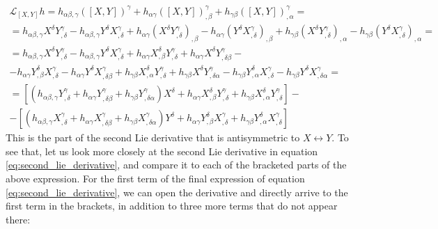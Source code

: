 \documentclass{article}
\begin{document}
\begin{equation}
\begin{gathered}
\label{eq:dev_lie_derivative_lie_brackets}
    \mathcal{L}_{[X,Y]} h = h_{\alpha\beta,\gamma}([X,Y])^\gamma + h_{\alpha\gamma} ([X,Y])^\gamma_{,\beta} + h_{\gamma\beta} ([X,Y])^\gamma_{,\alpha} = \\
    = h_{\alpha\beta,\gamma}X^\delta Y^\gamma_{,\delta} - h_{\alpha\beta,\gamma}Y^\delta X^\gamma_{,\delta} + 
    h_{\alpha\gamma}\left(X^\delta Y^\gamma_{,\delta}\right)_{,\beta} - h_{\alpha\gamma}\left(Y^\delta X^\gamma_{,\delta}\right)_{,\beta} + h_{\gamma\beta}\left(X^\delta Y^\gamma_{,\delta}\right)_{,\alpha} - h_{\gamma\beta}\left(Y^\delta X^\gamma_{,\delta}\right)_{,\alpha} = \\
    = h_{\alpha\beta, \gamma}X^\delta Y^\gamma_{,\delta} - h_{\alpha\beta,\gamma}Y^\delta X^\gamma_{,\delta} + 
    h_{\alpha\gamma} X^\delta_{,\beta} Y^\gamma_{,\delta} + 
    h_{\alpha\gamma} X^\delta Y^\gamma_{,\delta\beta} - \\ - h_{\alpha\gamma}Y^\delta_{,\beta} X^\gamma_{,\delta} - h_{\alpha\gamma}Y^\delta X^\gamma_{,\delta\beta} + h_{\gamma\beta} X^\delta_{,\alpha} Y^\gamma_{,\delta} + h_{\gamma\beta} X^\delta Y^\gamma_{,\delta\alpha} - h_{\gamma\beta} Y^\delta_{,\alpha} X^\gamma_{,\delta} - h_{\gamma\beta} Y^\delta X^\gamma_{,\delta\alpha} = \\ =
    \left[
        \left(
            h_{\alpha\beta, \gamma} Y^\gamma_{,\delta} +
            h_{\alpha\gamma} Y^\gamma_{,\delta\beta} +
            h_{\gamma\beta} Y^\gamma_{,\delta\alpha}
        \right)X^\delta +
        h_{\alpha\gamma} X^\delta_{,\beta} Y^\gamma_{,\delta} +
        h_{\gamma\beta} X^\delta_{,\alpha} Y^\gamma_{,\delta}
    \right] - \\
    - \left[
        \left(
            h_{\alpha\beta,\gamma} X^\gamma_{,\delta} +
        h_{\alpha\gamma} X^\gamma_{,\delta\beta} +
        h_{\gamma\beta} X^\gamma_{,\delta\alpha}
        \right) Y^\delta +
        h_{\alpha\gamma}Y^\delta_{,\beta}
        X^\gamma_{,\delta} +
        h_{\gamma\beta} Y^\delta_{,\alpha} X^\gamma_{,\delta}
    \right]
\end{gathered}
\end{equation}
This is the part of the second Lie derivative that is antisymmetric to $X \leftrightarrow Y$. To see that, let us look more closely at the second Lie derivative in equation \ref{eq:second_lie_derivative}, and compare it to each of the bracketed parts of the above expression. For the first term of the final expression of equation \ref{eq:second_lie_derivative}, we can open the derivative and directly arrive to the first term in the brackets, in addition to three more terms that do not appear there:
\end{document}
